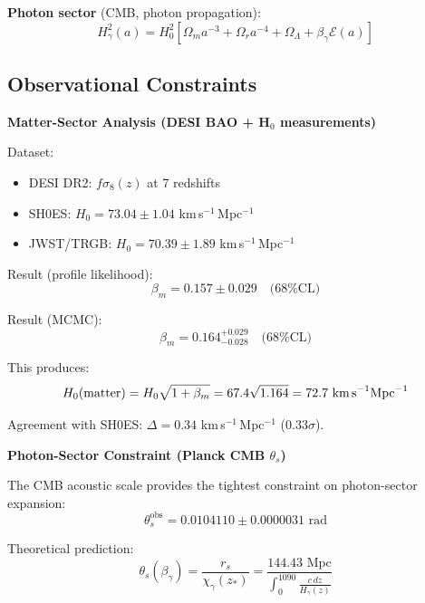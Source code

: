 \documentclass[twocolumn,superscriptaddress,prl,amsmath,amssymb]{revtex4-2}
\begin{document}
\textbf{Photon sector} (CMB, photon propagation):
\begin{equation}
H^2_\gamma(a) = H_0^2[\Omega_m a^{-3} + \Omega_r a^{-4} + \Omega_\Lambda + \beta_\gamma \mathcal{E}(a)]
\end{equation}

\subsection{Observational Constraints}

\textbf{Matter-Sector Analysis (DESI BAO + H$_0$ measurements)}

Dataset:
\begin{itemize}
\item DESI DR2: $f\sigma_8(z)$ at 7 redshifts~\cite{DESI2024}
\item SH0ES: $H_0 = 73.04 \pm 1.04$ km\,s$^{-1}$\,Mpc$^{-1}$~\cite{Riess2022}
\item JWST/TRGB: $H_0 = 70.39 \pm 1.89$ km\,s$^{-1}$\,Mpc$^{-1}$~\cite{Freedman2024}
\end{itemize}

Result (profile likelihood):
\begin{equation}
\beta_m = 0.157 \pm 0.029 \quad \text{(68\% CL)}
\end{equation}

Result (MCMC):
\begin{equation}
\beta_m = 0.164^{+0.029}_{-0.028} \quad \text{(68\% CL)}
\end{equation}

This produces:
\begin{equation}
H_0(\text{matter}) = H_0 \sqrt{1 + \beta_m} = 67.4\sqrt{1.164} = 72.7 \text{ km\,s}^{-1}\text{Mpc}^{-1}
\end{equation}

Agreement with SH0ES: $\Delta = 0.34$ km\,s$^{-1}$\,Mpc$^{-1}$ ($0.33\sigma$).

\textbf{Photon-Sector Constraint (Planck CMB $\theta_s$)}

The CMB acoustic scale provides the tightest constraint on photon-sector expansion:
\begin{equation}
\theta_s^{\text{obs}} = 0.0104110 \pm 0.0000031 \text{ rad}
\end{equation}

Theoretical prediction:
\begin{equation}
\theta_s(\beta_\gamma) = \frac{r_s}{\chi_\gamma(z_*)} = \frac{144.43 \text{ Mpc}}{\int_0^{1090} \frac{c\,dz}{H_\gamma(z)}}
\end{equation}
\end{document}
